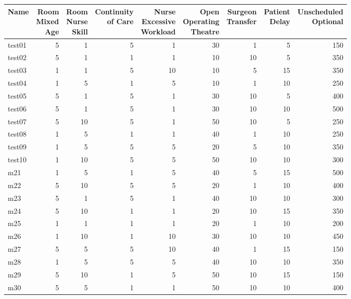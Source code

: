 {\scriptsize
\begin{tabular}{lrrrrrrrr}\toprule
Name &\shortstack{Room\\Mixed\\Age} &\shortstack{Room\\Nurse\\Skill} &\shortstack{Continuity\\of Care} &\shortstack{Nurse\\Excessive\\Workload} &\shortstack{Open\\Operating\\Theatre} &\shortstack{Surgeon\\Transfer} &\shortstack{Patient\\Delay} &\shortstack{Unscheduled\\Optional} \\ \midrule
test01&5&1&5&1&30&1&5&150\\ 
test02&5&1&1&1&10&10&5&350\\ 
test03&1&1&5&10&10&5&15&350\\ 
test04&1&5&1&5&10&1&10&250\\ 
test05&5&1&5&1&30&10&5&400\\ 
test06&5&1&5&1&30&10&10&500\\ 
test07&5&10&5&1&50&10&5&250\\ 
test08&1&5&1&1&40&1&10&250\\ 
test09&1&5&5&5&20&5&10&350\\ 
\rowcolor{green!10}test10&1&10&5&5&50&10&10&300\\ 
m21&1&5&1&5&40&5&15&500\\ 
m22&5&10&5&5&20&1&10&400\\ 
m23&5&1&5&1&40&10&10&300\\ 
m24&5&10&1&1&20&10&15&350\\ 
m25&1&1&1&1&20&1&10&200\\ 
m26&1&10&1&10&30&10&10&450\\ 
m27&5&5&5&10&40&1&15&150\\ 
m28&1&5&5&5&40&10&10&350\\ 
\rowcolor{green!10}m29&5&10&1&5&50&10&15&150\\ 
m30&5&5&1&1&50&10&10&400\\ 
\bottomrule
\end{tabular}

}